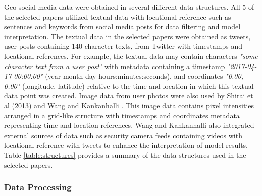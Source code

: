 Geo-social media data were obtained in several different data structures. All 5 of the selected papers utilized textual data with locational reference such as sentences and keywords from social media posts for data filtering and model interpretation. The textual data in the selected papers were obtained as tweets, user posts containing 140 character texts, from Twitter \cite{Twitter:2017} with timestamps and locational references. For example, the textual data may contain characters \textit{"some character text from a user post"} with metadata containing a timestamp \textit{"2017-04-17 00:00:00"} (year-month-day hours:minutes:seconds), and coordinates \textit{"0.00, 0.00"} (longitude, latitude) relative to the time and location in which this textual data point was created. Image data from user photos were also used by Shirai et al (2013) \cite{Shirai:2013} and Wang and Kankanhalli \cite{Wang:2015}. This image data contains pixel intensities arranged in a grid-like structure with timestamps and coordinates metadata representing time and location references. Wang and Kankanhalli \cite{Wang:2015} also integrated external sources of data such as security camera feeds containing videos with locational reference with tweets to enhance the interpretation of model results. Table \ref{table:structures} provides a summary of the data structures used in the selected papers.

\subsubsection{Data Processing} \label{data-processing}

